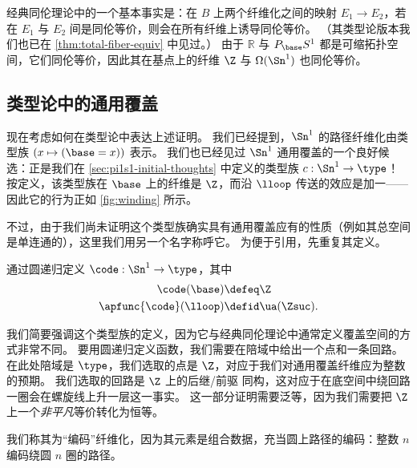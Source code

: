 经典同伦理论中的一个基本事实是：在 $B$ 上两个纤维化之间的映射 $E_1\to E_2$，若在 $E_1$ 与 $E_2$ 间是同伦等价，则会在所有纤维上诱导同伦等价。
（其类型论版本我们也已在 \cref{thm:total-fiber-equiv} 中见过。）
由于 $\mathbb{R}$ 与 $P_{\base} S^1$ 都是可缩拓扑空间，它们同伦等价，因此其在基点上的纤维 $\Z$ 与 $\Omega(\Sn ^1)$ 也同伦等价。

%

\subsection{类型论中的通用覆盖}
\label{sec:pi1s1-universal-cover}

%
%
%

现在考虑如何在类型论中表达上述证明。
我们已经提到，$\Sn^1$ 的路径纤维化由类型族 $(x\mapsto (\base=x))$ 表示。
我们也已经见过 $\Sn^1$ 通用覆盖的一个良好候选：正是我们在 \cref{sec:pi1s1-initial-thoughts} 中定义的类型族 $c:\Sn^1\to\type$！
按定义，该类型族在 $\base$ 上的纤维是 $\Z$，而沿 $\lloop$ 传送的效应是加一——因此它的行为正如 \cref{fig:winding} 所示。

不过，由于我们尚未证明这个类型族确实具有通用覆盖应有的性质（例如其总空间是单连通的），这里我们用另一个名字称呼它。
为便于引用，先重复其定义。

\begin{defn}[$\Sn^1$ 的通用覆盖] \label{S1-universal-cover}
  通过圆递归定义 $\code : \Sn ^1 \to \type$，其中
  \begin{align*}
    \code(\base) &\defeq \Z \\
    \apfunc{\code}({\lloop}) &\defid \ua(\Zsuc).
  \end{align*}
\end{defn}

我们简要强调这个类型族的定义，因为它与经典同伦理论中通常定义覆盖空间的方式非常不同。
要用圆递归定义函数，我们需要在陪域中给出一个点和一条回路。
在此处陪域是 $\type$，我们选取的点是 $\Z$，对应于我们对通用覆盖纤维应为整数的预期。
我们选取的回路是 $\Z$ 上的后继/前驱
%
%
同构，这对应于在底空间中绕回路一圈会在螺旋线上升一层这一事实。
这一部分证明需要泛等，因为我们需要把 $\Z$ 上一个\emph{非平凡}等价转化为恒等。

我们称其为“编码”纤维化，因为其元素是组合数据，充当圆上路径的编码：整数 $n$ 编码绕圆 $n$ 圈的路径。

